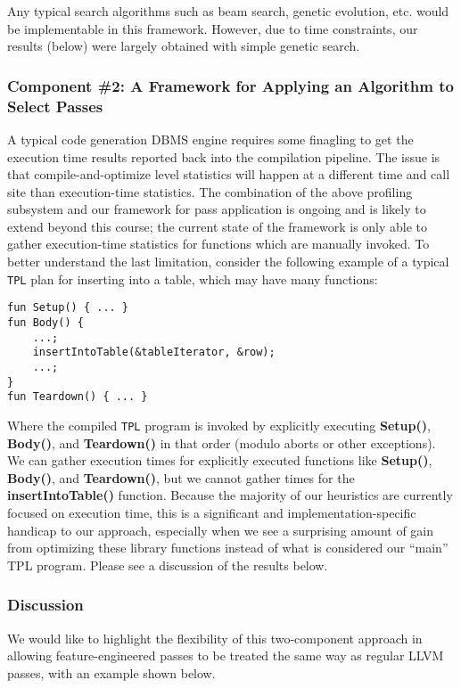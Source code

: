 \documentclass{vldb}
\newcommand{\tpl}{\texttt{TPL}\xspace}
\newcommand{\dbCode}[1]{{\sffamily\small \textbf{#1}}\xspace}
\begin{document}
Any typical search algorithms such as beam search, genetic evolution, etc. would be implementable in this framework. However, due to time constraints, our results (below) were largely obtained with simple genetic search.

\subsubsection{Component \#2: A Framework for Applying an Algorithm to Select Passes}

A typical code generation DBMS engine requires some finagling to get the execution time results reported back into the compilation pipeline. The issue is that compile-and-optimize level statistics will happen at a different time and call site than execution-time statistics. The combination of the above profiling subsystem and our framework for pass application is ongoing and is likely to extend beyond this course; the current state of the framework is only able to gather execution-time statistics for functions which are manually invoked. To better understand the last limitation, consider the following example of a typical \tpl plan for inserting into a table, which may have many functions:

\begin{lstlisting}
fun Setup() { ... }
fun Body() { 
    ...;
    insertIntoTable(&tableIterator, &row);
    ...;
}
fun Teardown() { ... }
\end{lstlisting}

Where the compiled \tpl program is invoked by explicitly executing \dbCode{Setup()}, \dbCode{Body()}, and \dbCode{Teardown()} in that order (modulo aborts or other exceptions). We can gather execution times for explicitly executed functions like \dbCode{Setup()}, \dbCode{Body()}, and \dbCode{Teardown()}, but we cannot gather times for the \dbCode{insertIntoTable()} function. Because the majority of our heuristics are currently focused on execution time, this is a significant and implementation-specific handicap to our approach, especially when we see a surprising amount of gain from optimizing these library functions instead of what is considered our “main” TPL program. Please see a discussion of the results below.

\subsubsection{Discussion}

We would like to highlight the flexibility of this two-component approach in allowing feature-engineered passes to be treated the same way as regular LLVM passes, with an example shown below.
\end{document}
